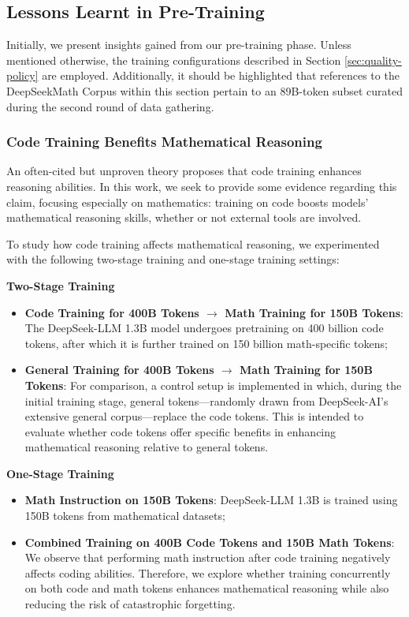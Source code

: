 \begin{itemize}[topsep=0pt]
\begin{itemize}[topsep=0pt]
\subsection{Lessons Learnt in Pre-Training}

Initially, we present insights gained from our pre-training phase. Unless mentioned otherwise, the training configurations described in Section \ref{sec:quality-policy} are employed. Additionally, it should be highlighted that references to the DeepSeekMath Corpus within this section pertain to an 89B-token subset curated during the second round of data gathering.

\subsubsection{Code Training Benefits Mathematical Reasoning}

An often-cited but unproven theory proposes that code training enhances reasoning abilities. In this work, we seek to provide some evidence regarding this claim, focusing especially on mathematics: training on code boosts models’ mathematical reasoning skills, whether or not external tools are involved.

To study how code training affects mathematical reasoning, we experimented with the following two-stage training and one-stage training settings:

\textbf{Two-Stage Training}

\begin{itemize}[topsep=0pt]
    \item \textbf{Code Training for 400B Tokens $\rightarrow$ Math Training for 150B Tokens}: The DeepSeek-LLM 1.3B model undergoes pretraining on 400 billion code tokens, after which it is further trained on 150 billion math-specific tokens;
    \item \textbf{General Training for 400B Tokens $\rightarrow$ Math Training for 150B Tokens}: For comparison, a control setup is implemented in which, during the initial training stage, general tokens—randomly drawn from DeepSeek-AI’s extensive general corpus—replace the code tokens. This is intended to evaluate whether code tokens offer specific benefits in enhancing mathematical reasoning relative to general tokens.
\end{itemize}

\textbf{One-Stage Training}

\begin{itemize}[topsep=0pt]
    \item \textbf{Math Instruction on 150B Tokens}: DeepSeek-LLM 1.3B is trained using 150B tokens from mathematical datasets;
    \item \textbf{Combined Training on 400B Code Tokens and 150B Math Tokens}: We observe that performing math instruction after code training negatively affects coding abilities. Therefore, we explore whether training concurrently on both code and math tokens enhances mathematical reasoning while also reducing the risk of catastrophic forgetting.
\end{itemize}


\end{itemize}
\end{itemize}
